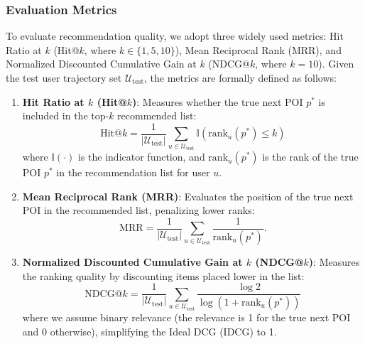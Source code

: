 \documentclass[10pt,twocolumn]{article}
\begin{document}
\subsubsection{Evaluation Metrics}
To evaluate recommendation quality, we adopt three widely used metrics: Hit Ratio at $k$ (Hit@$k$, where $k \in \{1, 5, 10\}$), Mean Reciprocal Rank (MRR), and Normalized Discounted Cumulative Gain at $k$ (NDCG@$k$, where $k=10$). Given the test user trajectory set $\mathcal{U}_{\mathrm{test}}$, the metrics are formally defined as follows:
\begin{enumerate}
    \item \textbf{Hit Ratio at $k$ (Hit@$k$)}: Measures whether the true next POI $p^*$ is included in the top-$k$ recommended list:
    \begin{equation}
        \mathrm{Hit@}k = \frac{1}{|\mathcal{U}_{\mathrm{test}}|} \sum_{u \in \mathcal{U}_{\mathrm{test}}} \mathbb{I}(\mathrm{rank}_u(p^*) \le k)
    \end{equation}
    where $\mathbb{I}(\cdot)$ is the indicator function, and $\mathrm{rank}_u(p^*)$ is the rank of the true POI $p^*$ in the recommendation list for user $u$.
    \item \textbf{Mean Reciprocal Rank (MRR)}: Evaluates the position of the true next POI in the recommended list, penalizing lower ranks:
    \begin{equation}
        \mathrm{MRR} = \frac{1}{|\mathcal{U}_{\mathrm{test}}|} \sum_{u \in \mathcal{U}_{\mathrm{test}}} \frac{1}{\mathrm{rank}_u(p^*)}.
    \end{equation}
    \item \textbf{Normalized Discounted Cumulative Gain at $k$ (NDCG@$k$)}: Measures the ranking quality by discounting items placed lower in the list:
    \begin{equation}
        \mathrm{NDCG@}k = \frac{1}{|\mathcal{U}_{\mathrm{test}}|} \sum_{u \in \mathcal{U}_{\mathrm{test}}} \frac{\log 2}{\log(1 + \mathrm{rank}_u(p^*))}
    \end{equation}
    where we assume binary relevance (the relevance is 1 for the true next POI and 0 otherwise), simplifying the Ideal DCG (IDCG) to 1.
\end{enumerate}
\end{document}
